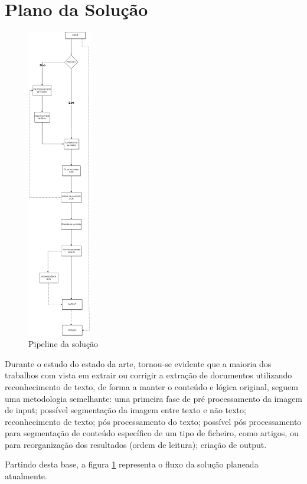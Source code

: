 \section{Plano da Solução}
\begin{figure}
    \includegraphics[width=0.25\textwidth]{images//diagramas/pipeline_geral.png}
    \caption{Pipeline da solução}
    \label{fig:pipeline_geral}
\end{figure}
Durante o estudo do estado da arte, tornou-se evidente que a maioria dos trabalhos com vista em extrair ou corrigir a extração de documentos utilizando reconhecimento de texto, de forma a manter o conteúdo e lógica original, seguem uma metodologia semelhante: uma primeira fase de pré processamento da imagem de input; possível segmentação da imagem entre texto e não texto; reconhecimento de texto; pós processamento do texto; possível pós processamento para segmentação de conteúdo específico de um tipo de ficheiro, como artigos, ou para reorganização dos resultados (ordem de leitura); criação de output.

Partindo desta base, a figura \ref{fig:pipeline_geral} representa o fluxo da solução planeada atualmente. 

